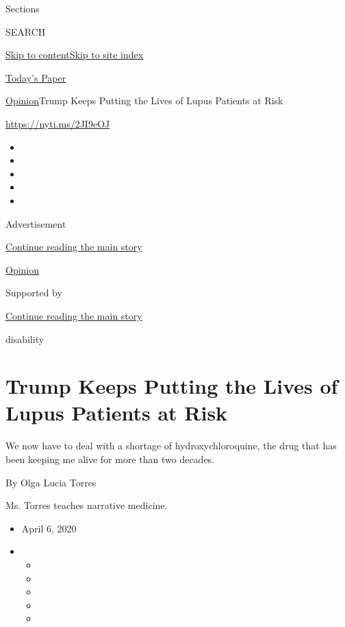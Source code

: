 Sections

SEARCH

\protect\hyperlink{site-content}{Skip to
content}\protect\hyperlink{site-index}{Skip to site index}

\href{https://myaccount.nytimes.com/auth/login?response_type=cookie\&client_id=vi}{}

\href{https://www.nytimes.com/section/todayspaper}{Today's Paper}

\href{/section/opinion}{Opinion}\textbar{}Trump Keeps Putting the Lives
of Lupus Patients at Risk

\href{https://nyti.ms/2JI9eOJ}{https://nyti.ms/2JI9eOJ}

\begin{itemize}
\item
\item
\item
\item
\item
\end{itemize}

Advertisement

\protect\hyperlink{after-top}{Continue reading the main story}

\href{/section/opinion}{Opinion}

Supported by

\protect\hyperlink{after-sponsor}{Continue reading the main story}

disability

\hypertarget{trump-keeps-putting-the-lives-of-lupus-patients-at-risk}{%
\section{Trump Keeps Putting the Lives of Lupus Patients at
Risk}\label{trump-keeps-putting-the-lives-of-lupus-patients-at-risk}}

We now have to deal with a shortage of hydroxychloroquine, the drug that
has been keeping me alive for more than two decades.

By Olga Lucia Torres

Ms. Torres teaches narrative medicine.

\begin{itemize}
\item
  April 6, 2020
\item
  \begin{itemize}
  \item
  \item
  \item
  \item
  \item
  \end{itemize}
\end{itemize}

